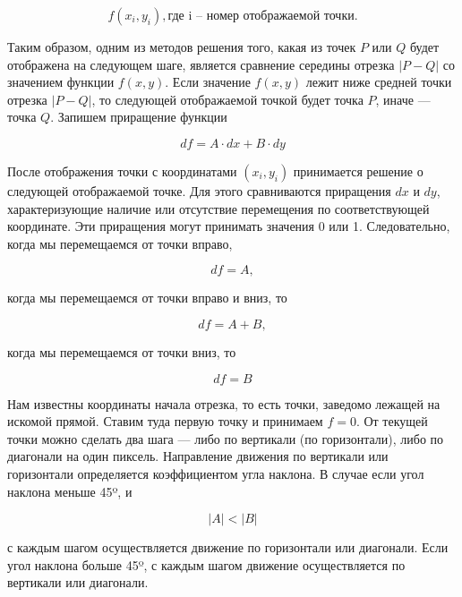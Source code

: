 \begin{equation}
	f(x_{i},y_{i}), \text{где i – номер отображаемой точки.}
\end{equation}

Таким образом, одним из методов решения того, какая из точек $P$ или $Q$ будет отображена на следующем шаге, является сравнение середины отрезка $|P-Q|$ со значением функции $f(x,y)$. Если значение $f(x,y)$ лежит ниже средней точки отрезка $|P-Q|$, то следующей отображаемой точкой будет точка $P$, иначе — точка $Q$.
Запишем приращение функции

\begin{equation}
	df=A \cdot dx+B \cdot dy
\end{equation}

После отображения точки с координатами $(x_{i},y_{i})$ принимается решение о следующей отображаемой точке. Для этого сравниваются приращения $dx$ и $dy$, характеризующие наличие или отсутствие перемещения по соответствующей координате. Эти приращения могут принимать значения 0 или 1. Следовательно, когда мы перемещаемся от точки вправо,

\begin{equation}
	df=A,
\end{equation}

когда мы перемещаемся от точки вправо и вниз, то

\begin{equation}
	df=A + B,
\end{equation}

когда мы перемещаемся от точки вниз, то

\begin{equation}
	df=B
\end{equation}

Нам известны координаты начала отрезка, то есть точки, заведомо лежащей на искомой прямой. Ставим туда первую точку и принимаем $f = 0$. От текущей точки можно сделать два шага — либо по вертикали (по горизонтали), либо по диагонали на один пиксель.
Направление движения по вертикали или горизонтали определяется коэффициентом угла наклона. В случае если угол наклона меньше 45º, и

\begin{equation}
|A|<|B|
\end{equation}

с каждым шагом осуществляется движение по горизонтали или диагонали.
Если угол наклона больше 45º, с каждым шагом движение осуществляется по вертикали или диагонали.


